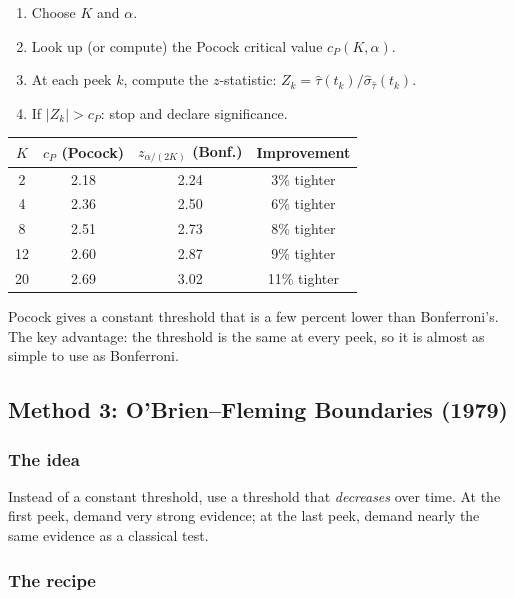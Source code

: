 \documentclass[12pt, a4paper]{article}
\begin{document}
\begin{enumerate}[nosep]
  \item Choose $K$ and $\alpha$.
  \item Look up (or compute) the Pocock critical value $c_P(K, \alpha)$.
  \item At each peek $k$, compute the $z$-statistic:
        $Z_k = \hat{\tau}(t_k) / \hat{\sigma}_{\hat{\tau}}(t_k)$.
  \item If $|Z_k| > c_P$: stop and declare significance.
\end{enumerate}

\begin{center}
\renewcommand{\arraystretch}{1.3}
\begin{tabular}{@{} c c c c @{}}
\toprule
$K$ & $c_P$ (Pocock) & $z_{\alpha/(2K)}$ (Bonf.) & Improvement \\
\midrule
2  & 2.18 & 2.24 & 3\% tighter \\
4  & 2.36 & 2.50 & 6\% tighter \\
8  & 2.51 & 2.73 & 8\% tighter \\
12 & 2.60 & 2.87 & 9\% tighter \\
20 & 2.69 & 3.02 & 11\% tighter \\
\bottomrule
\end{tabular}
\end{center}

\begin{plainlanguage}
Pocock gives a constant threshold that is a few percent lower than
Bonferroni's.  The key advantage: the threshold is the same at every peek,
so it is almost as simple to use as Bonferroni.
\end{plainlanguage}


\subsection{Method 3: O'Brien--Fleming Boundaries (1979)}

\subsubsection*{The idea}

Instead of a constant threshold, use a threshold that \emph{decreases} over
time.  At the first peek, demand very strong evidence; at the last peek,
demand nearly the same evidence as a classical test.

\subsubsection*{The recipe}
\end{document}
